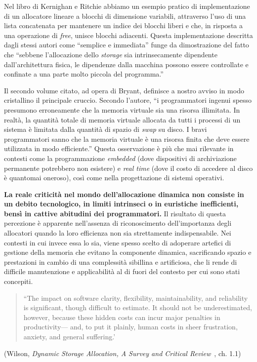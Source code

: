 Nel libro di Kernighan e Ritchie abbiamo un esempio pratico di implementazione di un allocatore lineare a blocchi di dimensione variabili, attraverso l’uso di una lista concatenata per mantenere un indice dei blocchi liberi e che, in risposta a una operazione di \textit{free}, unisce blocchi adiacenti. Questa implementazione descritta dagli stessi autori come ``semplice e immediata'' funge da dimostrazione del fatto che ``sebbene l’allocazione dello \textit{storage} sia intrinsecamente dipendente dall’architettura fisica, le dipendenze dalla macchina possono essere controllate e confinate a una parte molto piccola del programma.''

Il secondo volume citato, ad opera di Bryant, definisce a nostro avviso in modo cristallino il principale cruccio. Secondo l’autore, ``i programmatori ingenui spesso presumono erroneamente che la memoria virtuale sia una risorsa illimitata. In realtà, la quantità totale di memoria virtuale allocata da tutti i processi di un sistema è limitata dalla quantità di spazio di \textit{swap} su disco. I bravi programmatori sanno che la memoria virtuale è una risorsa finita che deve essere utilizzata in modo efficiente.'' Questa osservazione è più che mai rilevante in contesti come la programmazione \textit{embedded} (dove dispositivi di archiviazione permanente potrebbero non esistere) e \textit{real time} (dove il costo di accedere al disco è quantomai oneroso), così come nella progettazione di sistemi operativi.

\textbf{La reale criticità nel mondo dell’allocazione dinamica non consiste in un debito tecnologico, in limiti intrinseci o in euristiche inefficienti, bensì in cattive abitudini dei programmatori.} Il risultato di questa percezione è apparente nell’assenza di riconoscimento dell’importanza degli allocatori quando la loro efficienza non sia strettamente indispensabile. Nei contesti in cui invece essa lo sia, viene spesso scelto di adoperare artefici di gestione della memoria che evitano la componente dinamica, sacrificando spazio e prestazioni in cambio di una complessità sibillina e artificiosa, che li rende di difficile manutenzione e applicabilità al di fuori del contesto per cui sono stati concepiti.

\begin{quote}
``The impact on software clarity, flexibility, maintainability, and reliability is significant, though difficult to estimate. It should not be underestimated, however, because these hidden costs can incur major penalties in productivity--- and, to put it plainly, human costs in sheer frustration, anxiety, and general suffering.'
\end{quote}
\begin{flushright}
(Wilson, \textit{Dynamic Storage Allocation, A Survey and Critical Review}~\cite{wilson1995}, ch. 1.1)
\end{flushright}

